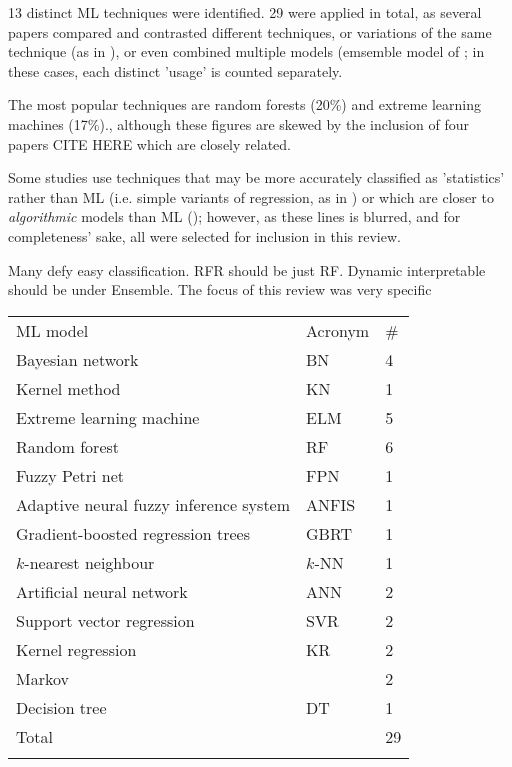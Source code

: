 \documentclass{article}
\begin{document}
13 distinct ML techniques were identified. 29 were applied in total, as several papers compared and contrasted different techniques, or variations of the same technique (as in \cite{lessan_fu_wen_2019}\cite{oneto_et_al_2016}\cite{milinkovic_et_al_2013}\cite{markovic_et_al_2015}), or even combined multiple models (emsemble model of \cite{nair_et_al_2019}; in these cases, each distinct 'usage' is counted separately. 

The most popular techniques are random forests (20\%) and extreme learning machines (17\%)., although these figures are skewed by the inclusion of four papers CITE HERE which are closely related.

Some studies use techniques that may be more accurately classified as 'statistics' rather than ML (i.e. simple variants of regression, as in \cite{pongnumkul_pechprasarn_kunaseth_chaipah_2014}\cite{wang_work_2015}) or which are closer to \textit{algorithmic} models than ML (\cite{hansen_goverde_van_der_meer_2010}); however, as these lines is blurred, and for completeness' sake, all were selected for inclusion in this review.

Many defy easy classification. RFR should be just RF. Dynamic interpretable should be under Ensemble.
The focus of this review was very specific

\begin{table}[h]
\begin{tabular}{lll}
\noalign{\smallskip}\hline \noalign{\smallskip}
ML model & Acronym & \# \\ 	\noalign{\smallskip}\hline \noalign{\smallskip}
Bayesian network & BN & 4 \\
Kernel method & KN & 1 \\
Extreme learning machine & ELM & 5 \\
Random forest & RF & 6 \\
Fuzzy Petri net & FPN & 1 \\
Adaptive neural fuzzy inference system & ANFIS & 1 \\
Gradient-boosted regression trees & GBRT & 1 \\
$k$-nearest neighbour & $k$-NN & 1 \\
Artificial neural network & ANN & 2 \\
Support vector regression & SVR & 2 \\
Kernel regression & KR & 2 \\
Markov &  & 2 \\
Decision tree & DT & 1 \\ 	\noalign{\smallskip}
Total                                    &         & 29	\\ \noalign{\smallskip} \hline
\end{tabular}
\end{table}
\end{document}
